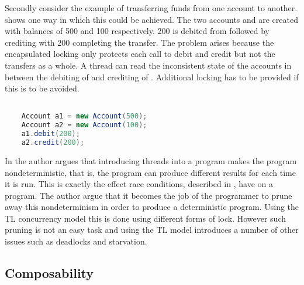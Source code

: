 Secondly consider the example of transferring funds from one account to another.  shows one way in which this could be achieved. The two accounts  and  are created with balances of 500 and 100 respectively. 200 is debited from  followed by crediting  with 200 completing the transfer. The problem arises because the encapsulated locking only protects each call to debit and credit but not the transfers as a whole\cite[p. 59]{sutter2005software}. A thread can read the inconsistent state of the accounts in between the debiting of  and crediting of . Additional locking has to be provided  if this is to be avoided.

\begin{lstlisting}[float,label=lst:account_example_transfer,
  caption={Funds transfer between two accounts},
  language=Java,  
  showspaces=false,
  showtabs=false,
  breaklines=true,
  showstringspaces=false,
  breakatwhitespace=true,
  commentstyle=\color{greencomments},
  keywordstyle=\color{bluekeywords},
  stringstyle=\color{redstrings}]  % Start your code-block

    Account a1 = new Account(500);
    Account a2 = new Account(100);
    a1.debit(200);
    a2.credit(200);
\end{lstlisting}

In \cite{lee2006problem} the author argues that introducing threads into a program makes the program nondeterministic, that is, the program can produce different results for each time it is run. This is exactly the effect race conditions, described in , have on a program. The author argue that it becomes the job of the programmer to prune away this nondeterminism in order to produce a deterministic program. Using the \ac{TL} concurrency model this is done using different forms of lock. However such pruning is not an easy task and using the \ac{TL} model introduces a number of other issues such as deadlocks and starvation.


\subsection{Composability}\label{subsec:tl_composability}

